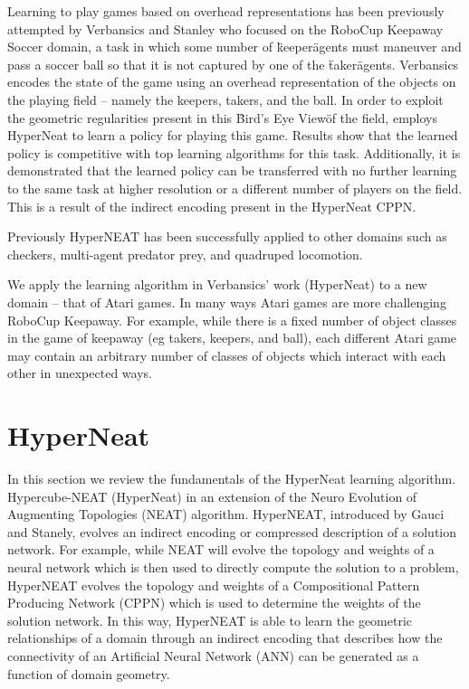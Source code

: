 \documentclass{article}
\begin{document}
Learning to play games based on overhead representations has been previously attempted by Verbansics and Stanley\cite{verbansics10} who focused on the RoboCup Keepaway Soccer domain, a task in which some number of \"keeper\" agents must maneuver and pass a soccer ball so that it is not captured by one of the \"taker\" agents. Verbansics encodes the state of the game using an overhead representation of the objects on the playing field -- namely the keepers, takers, and the ball. In order to exploit the geometric regularities present in this \"Bird's Eye View\" of the field, employs HyperNeat to learn a policy for playing this game. Results show that the learned policy is competitive with top learning algorithms for this task. Additionally, it is demonstrated that the learned policy can be transferred with no further learning to the same task at higher resolution or a different number of players on the field. This is a result of the indirect encoding present in the HyperNeat CPPN. 

Previously HyperNEAT has been successfully applied to other domains such as checkers\cite{Gauci08}, multi-agent predator prey\cite{Ambrosio08}, and quadruped locomotion\cite{clune09}. 

We apply the learning algorithm in Verbansics' work (HyperNeat) to a new domain -- that of Atari games. In many ways Atari games are more challenging RoboCup Keepaway. For example, while there is a fixed number of object classes in the game of keepaway (eg takers, keepers, and ball), each different Atari game may contain an arbitrary number of classes of objects which interact with each other in unexpected ways. 

\section{HyperNeat}
In this section we review the fundamentals of the HyperNeat learning algorithm. Hypercube-NEAT (HyperNeat) in an extension of the Neuro Evolution of Augmenting Topologies (NEAT) algorithm\cite{stanely02}. HyperNEAT, introduced by Gauci and Stanely\cite{Gauci08}, evolves an indirect encoding or compressed description of a solution network. For example, while NEAT will evolve the topology and weights of a neural network which is then used to directly compute the solution to a problem, HyperNEAT evolves the topology and weights of a Compositional Pattern Producing Network (CPPN) which is used to determine the weights of the solution network. In this way, HyperNEAT is able to learn the geometric relationships of a domain through an indirect encoding that describes how the connectivity of an Artificial Neural Network (ANN) can be generated as a function of domain geometry. 
\end{document}
